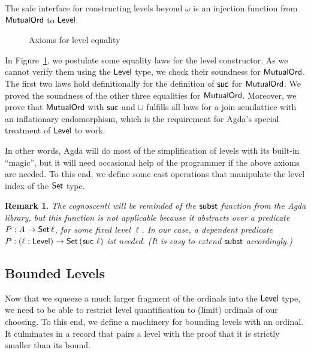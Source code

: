 \documentclass[manuscript,screen,review,anonymous]{acmart}
\newtheorem{remark}{Remark}
\begin{document}
\LCantor

The safe interface for constructing levels beyond $\omega$ is an
injection function from $\AMutualOrd$ to $\ALevel$.

\LtoLevel

\begin{figure}[tp]
  \LAxioms
  \caption{Axioms for level equality}
  \label{fig:axioms-level-equality}
\end{figure}
In Figure~\ref{fig:axioms-level-equality}, we postulate some equality
laws for the level constructor. As we cannot verify them using the
$\ALevel$ type, we check their soundness for $\AMutualOrd$.
The first two laws hold definitionally for the definition of $\Asuc$
for $\AMutualOrd$. We proved the soundness of the other three
equalities for $\AMutualOrd$.
Moreover, we prove that $\AMutualOrd$ with $\Asuc$ and $\sqcup$ fulfills all laws
for a join-semilattice with an inflationary endomorphism, which is the
requirement for Agda's special treatment of $\ALevel$ to work.

In other words, Agda will do most of the simplification of levels with
its built-in ``magic'', but it will need occasional help of the
programmer if the above axioms are needed. To this end, we define some
cast operations that manipulate the level index of the $\ASet$ type.

\Lcast

\begin{remark}
  The cognoscenti will be reminded of the $\Asubst$ function from the
  Agda library, but this function is not applicable because it
  abstracts over a predicate $P : A \to \ASeti\ell$, for some fixed
  level $\ell$. In our case, a \emph{dependent} predicate
  $P : (\ell : \ALevel) \to \ASeti{(\Asuc~\ell)}$ ist needed. (It is
  easy to extend $\Asubst$ accordingly.)
\end{remark}

\subsection{Bounded Levels}
\label{sec:bounded-levels}

Now that we squeeze a much larger fragment of the ordinals into the
$\ALevel$ type, we need to be able to restrict level quantification to
(limit) ordinals of our choosing. To this end, we define a machinery
for bounding levels with an ordinal. It culminates in a record that
pairs a level with the proof that it is strictly smaller than its bound.

\BQBoundedLevel
\end{document}

